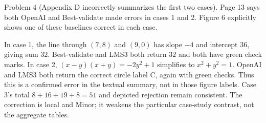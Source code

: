 \documentclass[10pt]{article}
\begin{document}
Problem 4 (Appendix D incorrectly summarizes the first two cases).  Page 13 says both OpenAI and Best-validate made errors in cases 1 and 2. Figure 6 explicitly shows one of these baselines correct in each case.\par
In case 1, the line through \((7,8)\) and \((9,0)\) has slope \(-4\) and intercept \(36\), giving sum \(32\). Best-validate and LMS3 both return \(32\) and both have green check marks. In case 2, \((x-y)(x+y)=-2y^2+1\) simplifies to \(x^2+y^2=1\). OpenAI and LMS3 both return the correct circle label C, again with green checks. Thus this is a confirmed error in the textual summary, not in those figure labels. Case 3’s total \(8+16+19+8=51\) and depicted rejection remain consistent. The correction is local and Minor; it weakens the particular case-study contrast, not the aggregate tables.\par
\end{document}
